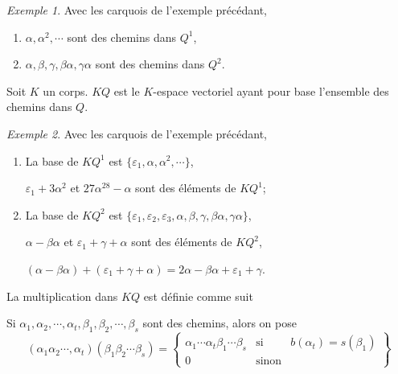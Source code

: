 \documentclass{report}
\theoremstyle{definition}
\theoremstyle{remark}
\newtheorem*{exem}{Exemple}
\begin{document}
	\begin{exem}
		Avec les carquois de l'exemple pr\'ec\'edant,
		\begin{enumerate}
			\item $\alpha, \alpha^2, \cdots$ sont des chemins dans $Q^1$,
			\item $\alpha, \beta, \gamma, \beta\alpha, \gamma\alpha$ sont des chemins dans $Q^2$.
		\end{enumerate}
	\end{exem}

	Soit $K$ un corps. $KQ$ est le $K$-espace vectoriel ayant pour base l'ensemble des chemins dans $Q$.

	\begin{exem}
		Avec les carquois de l'exemple pr\'ec\'edant,
		\begin{enumerate}
			\item La base de $KQ^1$ est $\{\varepsilon_1, \alpha, \alpha^2, \cdots\}$,

			$\varepsilon_1+3\alpha^2$ et $27\alpha^{28}-\alpha$ sont des \'el\'ements de $KQ^1$;
			\item La base de $KQ^2$ est $\{\varepsilon_1, \varepsilon_2, \varepsilon_3, \alpha, \beta, \gamma, \beta\alpha, \gamma\alpha\}$,

			$\alpha-\beta\alpha$ et $\varepsilon_1+\gamma+\alpha$ sont des \'el\'ements de $KQ^2$,

			$(\alpha-\beta\alpha) + (\varepsilon_1+\gamma+\alpha) = 2\alpha - \beta\alpha + \varepsilon_1 + \gamma$.
		\end{enumerate}
	\end{exem}

	La multiplication dans $KQ$ est d\'efinie comme suit

	Si $\alpha_1,\alpha_2,\cdots,\alpha_t, \beta_1,\beta_2,\cdots,\beta_s$ sont des chemins, alors on pose \[ (\alpha_1\alpha_2\cdots,\alpha_t) (\beta_1\beta_2\cdots\beta_s) = \left\{\begin{array}{lll}
		\alpha_1\cdots\alpha_t\beta_1\cdots\beta_s&\text{si}&b(\alpha_t) = s(\beta_1)\\
		0&\text{sinon}
	\end{array}\right\} \]
\end{document}
